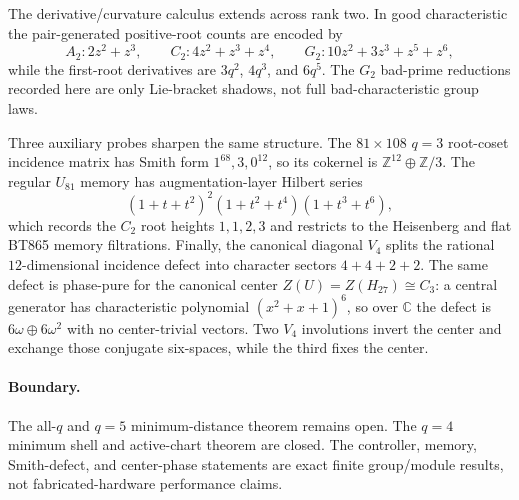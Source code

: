 The derivative/curvature calculus extends across rank two.  In good characteristic the pair-generated positive-root counts are encoded by
\[
 A_2:2z^2+z^3,\qquad C_2:4z^2+z^3+z^4,\qquad
 G_2:10z^2+3z^3+z^5+z^6,
\]
while the first-root derivatives are $3q^2$, $4q^3$, and $6q^5$.  The $G_2$ bad-prime reductions recorded here are only Lie-bracket shadows, not full bad-characteristic group laws.

Three auxiliary probes sharpen the same structure.  The $81\times108$ $q=3$ root-coset incidence matrix has Smith form $1^{68},3,0^{12}$, so its cokernel is $\mathbb Z^{12}\oplus\mathbb Z/3$.  The regular $U_{81}$ memory has augmentation-layer Hilbert series
\[
 (1+t+t^2)^2(1+t^2+t^4)(1+t^3+t^6),
\]
which records the $C_2$ root heights $1,1,2,3$ and restricts to the Heisenberg and flat BT865 memory filtrations.  Finally, the canonical diagonal $V_4$ splits the rational $12$-dimensional incidence defect into character sectors $4+4+2+2$.  The same defect is phase-pure for the canonical center $Z(U)=Z(H_{27})\cong C_3$: a central generator has characteristic polynomial $(x^2+x+1)^6$, so over $\mathbb C$ the defect is $6\omega\oplus6\omega^2$ with no center-trivial vectors.  Two $V_4$ involutions invert the center and exchange those conjugate six-spaces, while the third fixes the center.

\paragraph{Boundary.}
The all-$q$ and $q=5$ minimum-distance theorem remains open.  The $q=4$ minimum shell and active-chart theorem are closed.  The controller, memory, Smith-defect, and center-phase statements are exact finite group/module results, not fabricated-hardware performance claims.
\fi
%
